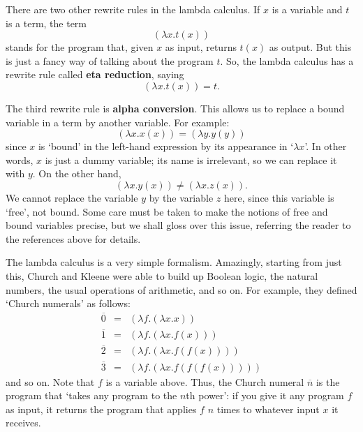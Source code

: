 \documentclass[12pt]{article}
\begin{document}
There are two other rewrite rules in the lambda calculus.  If $x$ is a
variable and $t$ is a term, the term
\[    (\lambda x . t(x)) \]
stands for the program that, given $x$ as input, returns $t(x)$ as
output.  But this is just a fancy way of talking about the program
$t$.  So, the lambda calculus has a rewrite rule called {\bf eta
reduction}, saying
\[        (\lambda x . t(x)) = t. \]

The third rewrite rule is {\bf alpha conversion}.  This allows
us to replace a bound variable in a term by another variable.  
For example:
\[        (\lambda x . x(x)) = (\lambda y . y(y))  \]
since $x$ is `bound' in the left-hand expression by its appearance
in `$\lambda x$'.   In other words, $x$ is just a dummy variable;
its name is irrelevant, so we can replace it with $y$.  On the other 
hand,
\[        (\lambda x . y(x)) \ne (\lambda x . z(x)).  \]
We cannot replace the variable $y$ by the variable $z$ here, since 
this variable is `free', not bound.  Some care must be taken to make
the notions of free and bound variables precise, but we shall gloss over 
this issue, referring the reader to the references above for details.

The lambda calculus is a very simple formalism.  Amazingly, starting
from just this, Church and Kleene were able to build up Boolean logic,
the natural numbers, the usual operations of arithmetic, and so on.
For example, they defined `Church numerals' as follows:
\[  \begin{array}{ccl}
       \overline{0} &=& (\lambda f . (\lambda x . x))          \\
       \overline{1} &=& (\lambda f . (\lambda x . f(x)))   \\
       \overline{2} &=& (\lambda f . (\lambda x . f(f(x))))   \\
       \overline{3} &=& (\lambda f . (\lambda x . f(f(f(x)))))
\end{array}   \]
and so on.  Note that $f$ is a variable above.  Thus, the Church
numeral $\overline{n}$ is the program that `takes any program to the
$n$th power': if you give it any program $f$ as input, it returns the
program that applies $f$ $n$ times to whatever input $x$ it receives.
\end{document}
